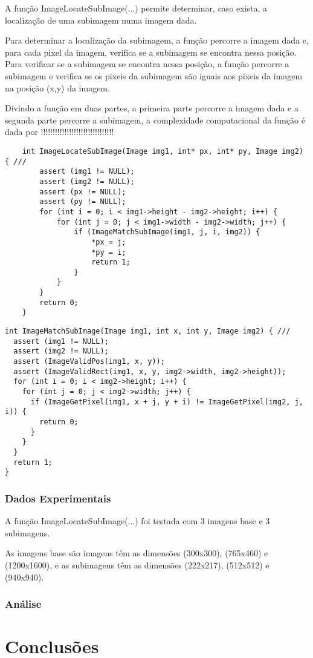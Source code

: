 \documentclass{report}
\begin{document}
A função ImageLocateSubImage(...) permite determinar, caso exista, a localização de uma subimagem numa imagem dada.
\par
Para determinar a localização da subimagem, a função percorre a imagem dada e, para cada pixel da imagem, verifica se a subimagem se encontra nessa posição. 
Para verificar se a subimagem se encontra nessa posição, a função percorre a subimagem e verifica se os pixeis da subimagem são iguais aos pixeis da imagem na posição (x,y) da imagem.
\par
Divindo a função em duas partes, a primeira parte percorre a imagem dada e a segunda parte percorre a subimagem, a complexidade computacional da função é dada por !!!!!!!!!!!!!!!!!!!!!!!!!!!!!!!
\par
\begingroup
\begin{lstlisting}
    int ImageLocateSubImage(Image img1, int* px, int* py, Image img2) { ///
        assert (img1 != NULL);
        assert (img2 != NULL);
        assert (px != NULL);
        assert (py != NULL);
        for (int i = 0; i < img1->height - img2->height; i++) {
            for (int j = 0; j < img1->width - img2->width; j++) {
                if (ImageMatchSubImage(img1, j, i, img2)) {
                    *px = j;
                    *py = i;
                    return 1;
                }
            }
        }
        return 0;
    }
    \end{lstlisting}
    
\begin{lstlisting}
int ImageMatchSubImage(Image img1, int x, int y, Image img2) { ///
  assert (img1 != NULL);
  assert (img2 != NULL);
  assert (ImageValidPos(img1, x, y));
  assert (ImageValidRect(img1, x, y, img2->width, img2->height));
  for (int i = 0; i < img2->height; i++) {
    for (int j = 0; j < img2->width; j++) {
      if (ImageGetPixel(img1, x + j, y + i) != ImageGetPixel(img2, j, i)) {
        return 0;
      }
    }
  }
  return 1;
}
\end{lstlisting}
\endgroup

\subsection{Dados Experimentais}

\tab A função ImageLocateSubImage(...) foi testada com 3 imagens base e 3 subimagens.
\par
As imagens base são imagens têm as dimensões (300x300), (765x460) e (1200x1600), e as subimagens têm as dimensões (222x217), (512x512) e (940x940).
\par



\subsection{Análise}



\chapter{Conclusões}





\printbibliography
\end{document}
